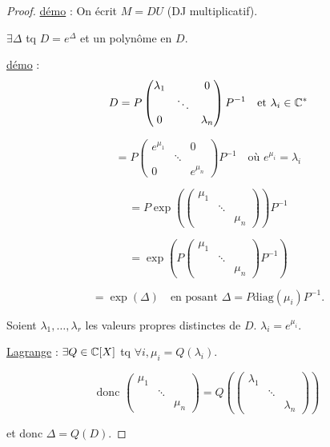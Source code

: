 \begin{proof}
    \uline{démo} : On écrit $M = D U$ (DJ multiplicatif).
    
     $\exists \Delta$ tq $D = e^\Delta$ et un polynôme en $D$.
    
    \uline{démo} :
    \[ D = P \begin{pmatrix} \lambda_1 & & 0 \\ & \ddots & \\ 0 & & \lambda_n \end{pmatrix} P^{-1} \quad \text{et } \lambda_i \in \mathbb{C}^* \]
    
    \[ = P \begin{pmatrix} e^{\mu_1} & & 0 \\ & \ddots & \\ 0 & & e^{\mu_n} \end{pmatrix} P^{-1} \quad \text{où } e^{\mu_i} = \lambda_i \]
    
    \[ = P \exp \left( \begin{pmatrix} \mu_1 & & \\ & \ddots & \\ & & \mu_n \end{pmatrix} \right) P^{-1} \]
    
    \[ = \exp \left( P \begin{pmatrix} \mu_1 & & \\ & \ddots & \\ & & \mu_n \end{pmatrix} P^{-1} \right) \]
    
    \[ = \exp(\Delta) \quad \text{en posant } \Delta = P \text{diag}(\mu_i) P^{-1}. \]
    
    Soient $\lambda_1, \dots, \lambda_r$ les valeurs propres distinctes de $D$.
    $\lambda_i = e^{\mu_i}$.
    
    \uline{Lagrange} : $\exists Q \in \mathbb{C}[X]$ tq $\forall i, \mu_i = Q(\lambda_i)$.
    
    \[ \text{donc } \begin{pmatrix} \mu_1 & & \\ & \ddots & \\ & & \mu_n \end{pmatrix} = Q \left( \begin{pmatrix} \lambda_1 & & \\ & \ddots & \\ & & \lambda_n \end{pmatrix} \right) \]
    
    et donc $\Delta = Q(D)$. 
\end{proof}

